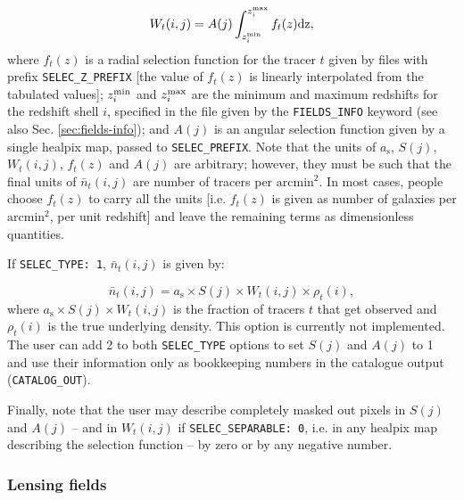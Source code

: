 \documentclass[12pt]{book} %
\begin{document}
\begin{equation}
W_t(i,j) = A(j)\int_{z^{\rm{min}}_i}^{z^{\rm{max}}_i} f_t(z) \rm{d}z,  
\label{eq:separable-selection-function} 
\end{equation}
where $f_t(z)$ is a radial selection function for the tracer $t$ 
given by files with prefix {\tt SELEC\_Z\_PREFIX} [the value of $f_t(z)$ 
is linearly interpolated from the tabulated values]; $z^{\rm{min}}_i$ and 
$z^{\rm{max}}_i$ are the minimum and maximum redshifts for the redshift shell $i$, 
specified in the file given by the {\tt FIELDS\_INFO} keyword (see also Sec. 
\ref{sec:fields-info}); and $A(j)$ is an 
angular selection function given by a single {\sc healpix} map, passed to {\tt SELEC\_PREFIX}. 
Note that the units of $a_{\mathrm{s}}$, $S(j)$, $W_t(i,j)$, $f_t(z)$ and $A(j)$ are arbitrary; 
however, they must be such that the final units of $\bar{n}_t(i,j)$ are number of tracers 
per $\mathrm{arcmin}^2$. In most cases, people choose $f_t(z)$ to carry 
all the units [i.e. $f_t(z)$ is given as number of galaxies per $\mathrm{arcmin}^2$, 
per unit redshift] and leave the remaining terms as dimensionless quantities.

If {\tt SELEC\_TYPE: 1}, $\bar{n}_t(i,j)$ is given by:

\begin{equation}
\bar{n}_t(i,j) = a_{\mathrm{s}} \times S(j) \times W_t(i,j) \times \rho_t(i),
\label{eq:fraction-selection-function} 
\end{equation}
where $a_{\mathrm{s}} \times S(j) \times W_t(i,j)$ is the fraction of tracers $t$ 
that get observed and $\rho_t(i)$ is the true underlying density. This option is 
currently not implemented. The user can add 2 to both {\tt SELEC\_TYPE} options 
to set $S(j)$ and $A(j)$ to 1 and use their information only as bookkeeping numbers 
in the catalogue output ({\tt CATALOG\_OUT}). 

Finally, note that the user may describe completely masked out pixels in $S(j)$ and $A(j)$  
-- and in $W_t(i,j)$ if {\tt SELEC\_SEPARABLE: 0}, i.e. in any {\sc healpix} map describing the 
selection function -- by zero or by any negative number.

\subsubsection{Lensing fields}
\end{document}
